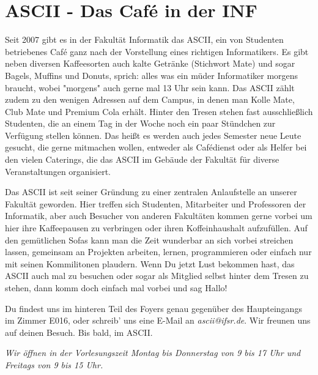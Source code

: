 \section{ASCII - Das Café in der INF}


Seit 2007 gibt es in der Fakultät Informatik das ASCII, ein von Studenten betriebenes Café ganz nach der Vorstellung eines richtigen Informatikers.
Es gibt neben diversen Kaffeesorten auch kalte Getränke (Stichwort Mate) und sogar Bagels, Muffins und Donuts, sprich:
alles was ein müder Informatiker morgens braucht, wobei "morgens" auch gerne mal 13 Uhr sein kann.
Das ASCII zählt zudem zu den wenigen Adressen auf dem Campus, in denen man Kolle Mate, Club Mate und Premium Cola erhält.
Hinter den Tresen stehen fast ausschließlich Studenten, die an einem Tag in der Woche noch ein paar Stündchen zur Verfügung stellen können.
Das heißt es werden auch jedes Semester neue Leute gesucht, die gerne mitmachen wollen, entweder als Cafédienst oder als Helfer bei den vielen Caterings, die das ASCII im Gebäude der Fakultät für diverse Veranstaltungen organisiert.

Das ASCII ist seit seiner Gründung zu einer zentralen Anlaufstelle an unserer Fakultät geworden.
Hier treffen sich Studenten, Mitarbeiter und Professoren der Informatik, aber auch Besucher von anderen Fakultäten kommen gerne vorbei um hier ihre Kaffeepausen zu verbringen oder ihren Koffeinhaushalt aufzufüllen.
Auf den gemütlichen Sofas kann man die Zeit wunderbar an sich vorbei streichen lassen, gemeinsam an Projekten arbeiten, lernen, programmieren oder einfach nur mit seinen Kommilitonen plaudern.
Wenn Du jetzt Lust bekommen hast, das ASCII auch mal zu besuchen oder sogar als Mitglied selbst hinter dem Tresen zu stehen, dann komm doch einfach mal vorbei und sag Hallo!

Du findest uns im hinteren Teil des Foyers genau gegenüber des Haupteingangs im Zimmer E016, oder schreib' uns eine E-Mail an \textit{ascii@ifsr.de}.
Wir freunen uns auf deinen Besuch.
Bis bald, im ASCII.

\textit{Wir öffnen in der Vorlesungszeit Montag bis Donnerstag von 9 bis 17 Uhr und Freitags von 9 bis 15 Uhr.}

